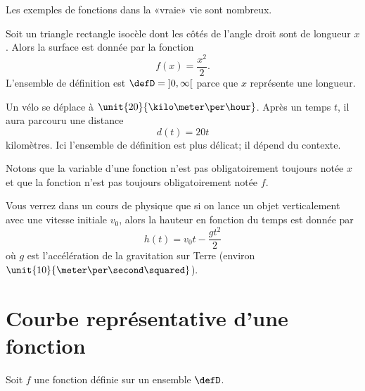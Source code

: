 Les exemples de fonctions dans la «vraie» vie sont nombreux.

\begin{example}
    Soit un triangle rectangle isocèle dont les côtés de l'angle droit sont de longueur \( x\). Alors la surface est donnée par la fonction
    \begin{equation}
        f(x)=\frac{ x^2 }{2}.
    \end{equation}
    L'ensemble de définition est \( \defD=\mathopen] 0 , \infty \mathclose[\) parce que \( x\) représente une longueur.
\end{example}

\begin{example}
    Un vélo se déplace à \( \unit{20}{\kilo\meter\per\hour}\). Après un temps \( t\), il aura parcouru une distance
    \begin{equation}
        d(t)=20t
    \end{equation}
    kilomètres. Ici l'ensemble de définition est plus délicat; il dépend du contexte.

    Notons que la variable d'une fonction n'est pas obligatoirement toujours notée \( x\) et que la fonction n'est pas toujours obligatoirement notée \( f\).
\end{example}

\begin{example}
    Vous verrez dans un cours de physique que si on lance un objet verticalement avec une vitesse initiale \( v_0\), alors la hauteur en fonction du temps est donnée par
    \begin{equation}
        h(t)=v_0t-\frac{ gt^2 }{2}
    \end{equation}
    où \( g\) est l'accélération de la gravitation sur Terre (environ \( \unit{10}{\meter\per\second\squared}\)).
\end{example}

\section{Courbe représentative d'une fonction}

Soit $f$ une fonction définie sur un ensemble $\defD$.


